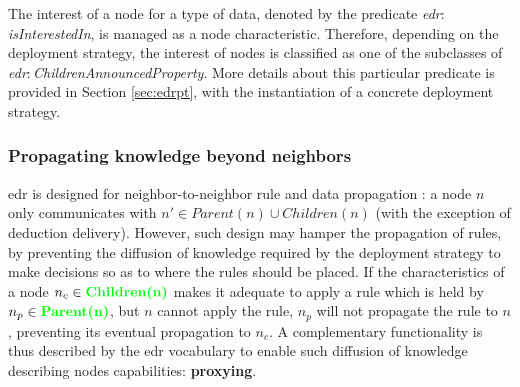 \documentclass{iosart2c}
\newcommand{\added}[1]{\textcolor{green}{\textbf{#1}}}
\newcommand{\namespace}[1]{\textit{#1$:$}}
\newcommand{\concept}[2]{\namespace{#1}\-\textit{#2}}
\begin{document}
The interest of a node for a type of data, denoted by the predicate \concept{edr}{is\-Interested\-In}, is managed as a node characteristic.
Therefore, depending on the deployment strategy, the interest of nodes is classified as one of the subclasses of \concept{edr}{Children\-Announced\-Property}.
More details about this particular predicate is provided in Section \textsection \ref{sec:edrpt}, with the instantiation of a concrete deployment strategy.

\subsubsection{Propagating knowledge beyond neighbors}
\label{subsubs:proxying}

\gls{edr} is designed for neighbor-to-neighbor rule and data propagation : a node $n$ only communicates with $n'\in Parent(n)\cup Children(n)$ (with the exception of deduction delivery).
However, such design may hamper the propagation of rules, by preventing the diffusion of knowledge required by the deployment strategy to make decisions so as to where the rules should be placed.
If the characteristics of a node $n_{c}\in \added{Children(n)}$ makes it adequate to apply a rule which is held by $n_{p}\in \added{Parent(n)}$, but $n$ cannot apply the rule, $n_{p}$ will not propagate the rule to $n$, preventing its eventual propagation to $n_{c}$.
A complementary functionality is thus described by the \gls{edr} vocabulary to enable such diffusion of knowledge describing nodes capabilities: \textbf{proxying}.
\end{document}
